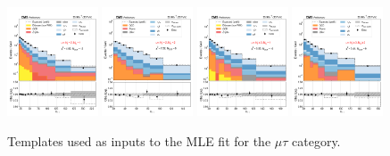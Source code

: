 \begin{figure}[htb!]
    \includegraphics[width=0.24\textwidth]{chapters/Analysis/sectionStatisticalAnalysis/figures/fit/mutau_cat_eq2_eq1}
    \includegraphics[width=0.24\textwidth]{chapters/Analysis/sectionStatisticalAnalysis/figures/fit/mutau_cat_eq2_eq2}
    \includegraphics[width=0.24\textwidth]{chapters/Analysis/sectionStatisticalAnalysis/figures/fit/mutau_cat_gt3_eq1}
    \includegraphics[width=0.24\textwidth]{chapters/Analysis/sectionStatisticalAnalysis/figures/fit/mutau_cat_gt3_gt2}
    \caption{Templates used as inputs to the MLE fit for the $\mu\tau$
    category.}
    \label{fig:fits_templates_mutau}
\end{figure}


